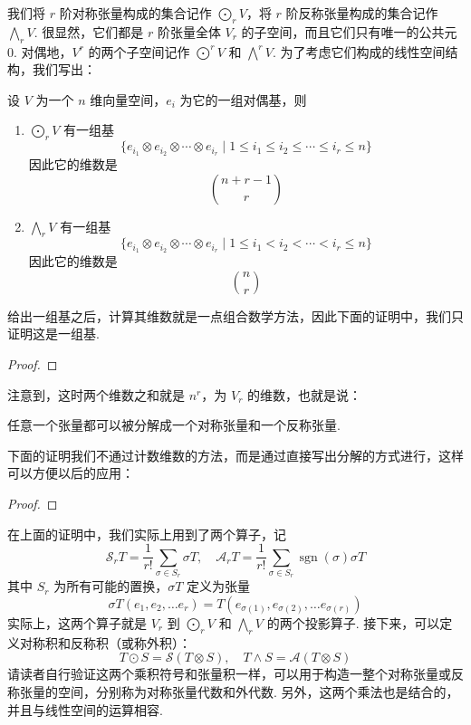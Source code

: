 我们将 $r$ 阶对称张量构成的集合记作 $\bigodot_r V$，将 $r$ 阶反称张量构成的集合记作 $\bigwedge_r V$. 很显然，它们都是 $r$ 阶张量全体 $V_r$ 的子空间，而且它们只有唯一的公共元 $0$. 对偶地，$V^r$ 的两个子空间记作 $\bigodot^r V$ 和 $\bigwedge^r V$. 为了考虑它们构成的线性空间结构，我们写出：

\begin{lemma}{}{}
    设 $V$ 为一个 $n$ 维向量空间，${e_i}$ 为它的一组对偶基，则
    \begin{enumerate}
        \item $\bigodot_r V$ 有一组基\[
        \{e_{i_1} \otimes e_{i_2} \otimes \cdots \otimes e_{i_r} \mid 1 \leqslant i_1 \leqslant i_2 \leqslant \cdots \leqslant i_r \leqslant n\}
        \]
        因此它的维数是
        \[
        \binom{n + r - 1}{r}
        \]
        \item $\bigwedge_r V$ 有一组基\[
        \{e_{i_1} \otimes e_{i_2} \otimes \cdots \otimes e_{i_r} \mid 1 \leqslant i_1 < i_2 < \cdots < i_r \leqslant n\}
        \]
        因此它的维数是
        \[
        \binom{n}{r}
        \]
    \end{enumerate}
\end{lemma}

给出一组基之后，计算其维数就是一点组合数学方法，因此下面的证明中，我们只证明这是一组基.

\begin{proof}

\end{proof}

注意到，这时两个维数之和就是 $n^r$，为 $V_r$ 的维数，也就是说：

\begin{corollary}{}{}
    任意一个张量都可以被分解成一个对称张量和一个反称张量.
\end{corollary}

下面的证明我们不通过计数维数的方法，而是通过直接写出分解的方式进行，这样可以方便以后的应用：

\begin{proof}

\end{proof}

在上面的证明中，我们实际上用到了两个算子，记 \[
\mathcal{S}_r T = \frac{1}{r!} \sum_{\sigma \in S_r} \sigma T, \quad \mathcal{A}_r T = \frac{1}{r!} \sum_{\sigma \in S_r} \mathop{\mathrm{sgn}}(\sigma) \sigma T
\]
其中 $S_r$ 为所有可能的置换，$\sigma T$ 定义为张量
\[
\sigma T(e_1, e_2, \ldots e_r) = T(e_{\sigma(1)}, e_{\sigma(2)}, \ldots e_{\sigma(r)})
\]
实际上，这两个算子就是 $V_r$ 到 $\bigodot_r V$ 和 $\bigwedge_r V$ 的两个投影算子. 接下来，可以定义对称积和反称积（或称外积）：
\[
T \odot S = \mathcal{S} (T \otimes S), \quad T \wedge S = \mathcal{A} (T \otimes S)
\]
请读者自行验证这两个乘积符号和张量积一样，可以用于构造一整个对称张量或反称张量的空间，分别称为对称张量代数和外代数. 另外，这两个乘法也是结合的，并且与线性空间的运算相容.


